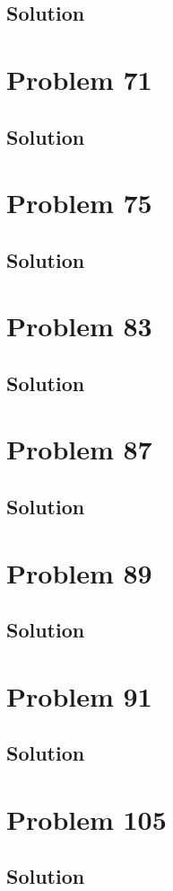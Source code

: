 \documentclass[12pt]{article}
\begin{document}
        \subsection{Solution}

    \pagebreak
    \section{Problem 71}

        \subsection{Solution}

    \pagebreak
    \section{Problem 75}

        \subsection{Solution}

    \pagebreak
    \section{Problem 83}

        \subsection{Solution}

    \pagebreak
    \section{Problem 87}

        \subsection{Solution}

    \pagebreak
    \section{Problem 89}

        \subsection{Solution}

    \pagebreak
    \section{Problem 91}

        \subsection{Solution}

    \pagebreak
    \section{Problem 105}

        \subsection{Solution}

    \pagebreak
    \tableofcontents
\end{document}
